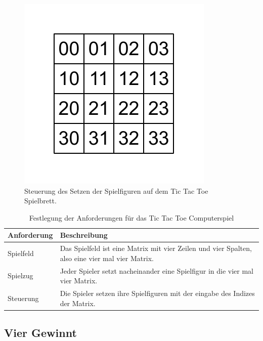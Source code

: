 \begin{figure}[!htbp]
  \centering
  \includegraphics[scale = 1]{inhalt/abbildungen/vier_mal_vier_matrix.pdf}
  \caption{Steuerung des Setzen der Spielfiguren auf dem Tic Tac Toe Spielbrett.}
  \label{fig:kreiseUndKreuzeSetzen}
\end{figure}



\begin{table}
\caption{Festlegung der Anforderungen für das Tic Tac Toe Computerspiel}
\begin{tabularx}{\textwidth}{p{}|p{}}
\textbf{Anforderung} & \textbf{Beschreibung} \\
\hline
Spielfeld	& Das Spielfeld ist eine Matrix mit vier Zeilen und vier Spalten, also eine vier mal vier Matrix. \\
\hline
Spielzug	& Jeder Spieler setzt nacheinander eine Spielfigur in die vier mal vier Matrix. \\
\hline
Steuerung 	& Die Spieler setzen ihre Spielfiguren mit der eingabe des Indizes der Matrix. \\
\end{tabularx}
\label{tab:tttAnforderungen}
\end{table}

\subsection{Vier Gewinnt}

